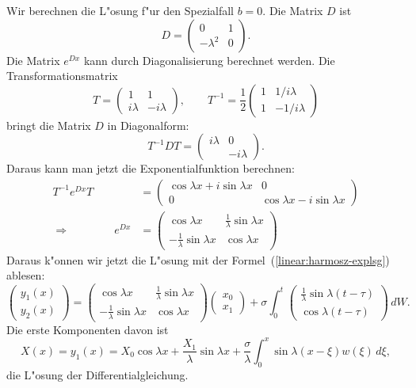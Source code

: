 \begin{beispiel}
Wir berechnen die L"osung f"ur den Spezialfall $b=0$.
Die Matrix $D$ ist
\[
D=\begin{pmatrix}
0&1\\-\lambda^2&0
\end{pmatrix}.
\]
Die Matrix $e^{Dx}$ kann durch Diagonalisierung berechnet werden.
Die Transformationsmatrix
\[
T
=
\begin{pmatrix}
1&1\\
i\lambda&-i\lambda
\end{pmatrix},
\qquad
T^{-1}
=
\frac12
\begin{pmatrix}
1& 1/i\lambda\\
1&-1/i\lambda
\end{pmatrix}
\]
bringt die Matrix $D$ in Diagonalform:
\[
T^{-1}DT
=
\begin{pmatrix}
i\lambda&        0\\
        &-i\lambda
\end{pmatrix}.
\]
Daraus kann man jetzt die Exponentialfunktion berechnen:
\begin{align*}
T^{-1}e^{Dx}T
&=
\begin{pmatrix}
\cos\lambda x+i\sin\lambda x&              0             \\
              0             &\cos\lambda x-i\sin\lambda x
\end{pmatrix}
\\
\Rightarrow\qquad\qquad
e^{Dx}
&=
\begin{pmatrix}
                \cos\lambda x&\frac1{\lambda}\sin\lambda x\\
-\frac1{\lambda}\sin\lambda x&               \cos\lambda x
\end{pmatrix}
\end{align*}
Daraus k"onnen wir jetzt die L"osung mit der
Formel~(\ref{linear:harmosz-explsg}) ablesen:
\begin{equation}
\begin{pmatrix}
y_1(x)\\y_2(x)
\end{pmatrix}
=
\begin{pmatrix}
                \cos\lambda x&\frac1{\lambda}\sin\lambda x\\
-\frac1{\lambda}\sin\lambda x&               \cos\lambda x
\end{pmatrix}
\begin{pmatrix}x_0\\x_1\end{pmatrix}
+
\sigma\int_0^t
\begin{pmatrix}
\frac1{\lambda}\sin\lambda(t-\tau)\\
               \cos\lambda(t-\tau)
\end{pmatrix}\,dW.
\end{equation}
Die erste Komponenten davon ist
\begin{equation}
X(x)
=
y_1(x)
=
X_0\cos\lambda x+\frac{X_1}{\lambda}\sin\lambda x
+
\frac{\sigma}{\lambda}\int_0^x\sin\lambda(x-\xi)w(\xi)\,d\xi,
\label{linear:harmosz-y}
\end{equation}
die L"osung der Differentialgleichung.
\end{beispiel}

